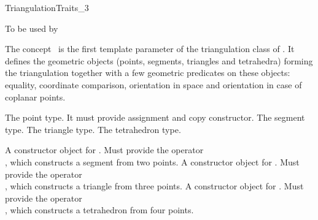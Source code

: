 

\begin{ccRefConcept}{TriangulationTraits_3}


To be used by \protect {}

\ccDefinition
The concept \ccRefName\ is the first template parameter of the
triangulation class  of \cgal. It
defines the geometric
objects (points, segments, triangles and tetrahedra) forming the
triangulation together with a few geometric predicates on these objects:
equality, coordinate comparison, orientation in space and orientation
in case of coplanar points.

\ccTypes
{}

{The point type. It must provide assignment and copy constructor.}
\ccGlue
{}
{The  segment type.}
\ccGlue
{}
{The triangle type.}
\ccGlue
{}
{The tetrahedron type.}


 {A constructor object for
.  Must provide the operator\\
,
which constructs a  segment from two points.}
\ccGlue
{} {A constructor object for
.  Must provide the operator\\
,
which constructs a triangle from three points.}
\ccGlue
{} {A constructor object for
.  Must provide the operator\\
,
which constructs a tetrahedron from four points.}


\end{ccRefConcept}
